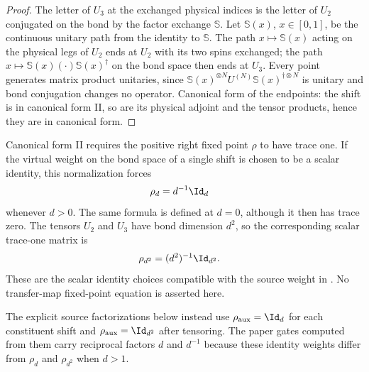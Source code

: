 \begin{proof}\leanok
    The letter of $U_3$ at the exchanged physical indices is the letter of $U_2$
    conjugated on the bond by the factor exchange $\mathbb S$. Let $\mathbb S(x)$,
    $x\in[0,1]$, be the continuous unitary path from the identity to $\mathbb S$.
    The path $x\mapsto\mathbb S(x)$ acting on the physical legs of $U_2$ ends at
    $U_2$ with its two spins exchanged; the path $x\mapsto\mathbb S(x)(\cdot)\mathbb S(x)^\dagger$
    on the bond space then ends at $U_3$. Every point generates matrix product
    unitaries, since $\mathbb S(x)^{\otimes N}U^{(N)}\mathbb S(x)^{\dagger\otimes N}$ is
    unitary and bond conjugation changes no operator. Canonical form of the
    endpoints: the shift is in canonical form II, so are its physical adjoint
    and the tensor products, hence they are in canonical form.
\end{proof}

\begin{definition}
    \label{def:mpu_shift_trace_weight}
    \leanok
    Canonical form II requires the positive right fixed point $\rho$ to have
    trace one. If the virtual weight on the bond space of a single shift is
    chosen to be a scalar identity, this normalization forces
    \begin{align}
        \rho_d & =d^{-1}\Id_d
    \end{align}
    whenever $d>0$. The same formula is defined at $d=0$, although it then has
    trace zero. The tensors $U_2$ and $U_3$ have bond dimension $d^2$, so the
    corresponding scalar trace-one matrix is
    \begin{align}
        \rho_{d^2} & =(d^2)^{-1}\Id_{d^2}.
    \end{align}
    These are the scalar identity choices compatible with the source weight in
    \cite[equation labelled~\texttt{Y1Y1X1X1}]{Cirac2017MPU}. No transfer-map
    fixed-point equation is asserted here.

    The explicit source factorizations below instead use
    $\rho_{\mathrm{aux}}=\Id_d$ for each constituent shift and
    $\rho_{\mathrm{aux}}=\Id_{d^2}$ after tensoring. The paper gates computed
    from them carry reciprocal factors $d$ and $d^{-1}$ because these identity
    weights differ from $\rho_d$ and $\rho_{d^2}$ when $d>1$.
\end{definition}

